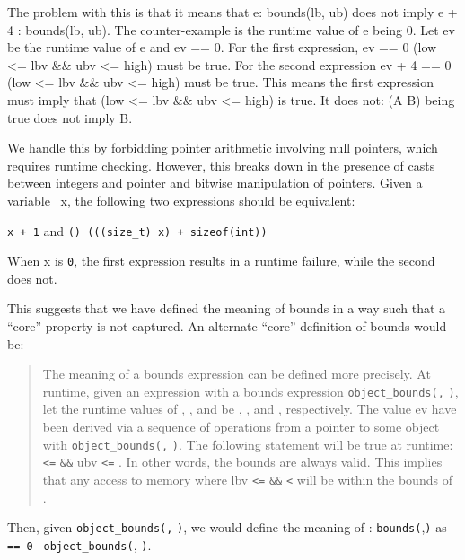 The problem with this is that it means that e: bounds(lb, ub) does not
imply e + 4 : bounds(lb, ub). The counter-example is the runtime value
of e being 0. Let ev be the runtime value of e and ev == 0. For the
first expression, ev == 0 \textbar{}\textbar{} (low \textless{}= lbv
\&\& ubv \textless{}= high) must be true. For the second expression ev +
4 == 0 \textbar{}\textbar{} (low \textless{}= lbv \&\& ubv \textless{}=
high) must be true. This means the first expression must imply that (low
\textless{}= lbv \&\& ubv \textless{}= high) is true. It does not: (A
\textbar{}\textbar{} B) being true does not imply B.

We handle this by forbidding pointer arithmetic involving null pointers,
which requires runtime checking. However, this breaks down in the
presence of casts between integers and pointer and bitwise manipulation
of pointers. Given a variable \arrayptrint\ x,
the following two expressions should be equivalent:

\texttt{x + 1} and \texttt{(\arrayptrint) (((size\_t) x) + sizeof(int))}

When x is \texttt{0}, the first expression results in a runtime failure,
while the second does not.

This suggests that we have defined the meaning of bounds in a way such
that a ``core'' property is not captured. An alternate ``core''
definition of bounds would be:

\begin{quote}
The meaning of a bounds expression can be defined more precisely. At
runtime, given an expression  with a bounds expression
\texttt{object\_bounds(}\texttt{,} \texttt{)}, let the
runtime values of , , and  be ,
, and , respectively. The value ev have been derived
via a sequence of operations from a pointer to some object 
with \texttt{object\_bounds(}\texttt{,} \texttt{)}.
The following statement will be true at runtime: 
\texttt{\textless{}=}  \texttt{\&\&} ubv \texttt{\textless{}=}
. In other words, the bounds are always valid. This implies
that any access to memory where lbv \texttt{\textless{}=} 
\texttt{\&\&}  \texttt{\textless{}}  will be within
the bounds of .
\end{quote}

Then, given \texttt{object\_bounds(}\texttt{,}
\texttt{)}, we would define the meaning of  :
\texttt{bounds(},\texttt{)} as  \texttt{== 0
\textbar{}\textbar{}} \texttt{object\_bounds(},
\texttt{)}.

